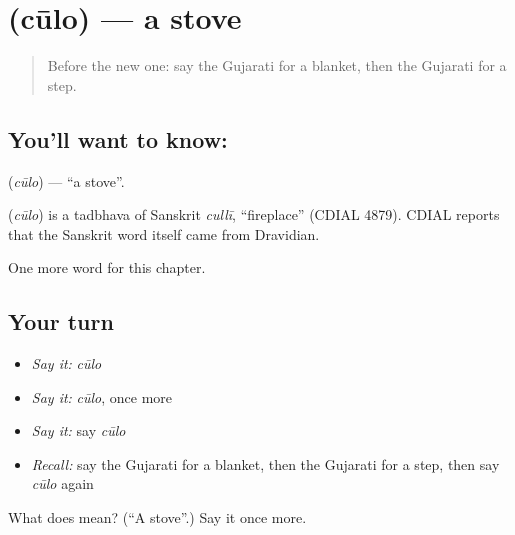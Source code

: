 \section[\texorpdfstring{\gu{ચૂલો} (cūlo)}{ચૂલો (cūlo)}]{ (cūlo) — a stove}

\label{lesson:GU-C107-culo}



\begin{quote}
Before the new one: say the Gujarati for a blanket, then the Gujarati for a step.
\end{quote}

\subsection*{You'll want to know: }
\textbf{} (\emph{cūlo}) — \textquotedblleft{}a stove\textquotedblright{}.

\begin{cousinweb}
\textbf{} (\emph{cūlo}) is a tadbhava of Sanskrit \emph{cullī}, \textquotedblleft{}fireplace\textquotedblright{} (CDIAL 4879). CDIAL reports that the Sanskrit word itself came from Dravidian.
\end{cousinweb}

\begin{grammarlens}[title={What you've built}]
One more word for this chapter.
\end{grammarlens}

\subsection*{Your turn}
\begin{itemize}
\raggedright
  \item \emph{Say it:} \emph{cūlo}
  \item \emph{Say it:} \emph{cūlo}, once more
  \item \emph{Say it:} say \emph{cūlo}
  \item \emph{Recall:} say the Gujarati for a blanket, then the Gujarati for a step, then say \emph{cūlo} again
\end{itemize}

\begin{tcolorbox}[breakable,colback=teal!4,colframe=teal!35!black,title={Before you move on}]
What does  mean? (\textquotedblleft{}A stove\textquotedblright{}.) Say it once more.
\end{tcolorbox}
